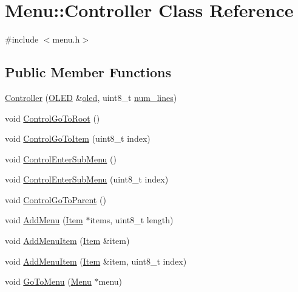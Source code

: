 \hypertarget{class_menu_1_1_controller}{}\section{Menu\+:\+:Controller Class Reference}
\label{class_menu_1_1_controller}


{\ttfamily \#include $<$menu.\+h$>$}

\subsection*{Public Member Functions}
\begin{DoxyCompactItemize}
\item 
\hyperlink{class_menu_1_1_controller_afcbda47e43a9753875631f0d4106f604}{Controller} (\hyperlink{class_o_l_e_d}{O\+L\+ED} \&\hyperlink{class_menu_1_1_controller_aaa0388123d9e3bb0d4f546336e2b502d}{oled}, uint8\+\_\+t \hyperlink{class_menu_1_1_controller_a80d614a66d1ffa2612688776842f1f31}{num\+\_\+lines})
\item 
void \hyperlink{class_menu_1_1_controller_a4d270009fff9dfc6baa4433f219626c4}{Control\+Go\+To\+Root} ()
\item 
void \hyperlink{class_menu_1_1_controller_a0dae623388e9bb9e651385d0ef9a2394}{Control\+Go\+To\+Item} (uint8\+\_\+t index)
\item 
void \hyperlink{class_menu_1_1_controller_a9a4c0ccd822f485834ec9abb4133a059}{Control\+Enter\+Sub\+Menu} ()
\item 
void \hyperlink{class_menu_1_1_controller_a8bc1d62574e86a08d5a60652370dd21a}{Control\+Enter\+Sub\+Menu} (uint8\+\_\+t index)
\item 
void \hyperlink{class_menu_1_1_controller_ad4bcb0925c933dce2cceacdbd1b26294}{Control\+Go\+To\+Parent} ()
\item 
void \hyperlink{class_menu_1_1_controller_a49696644ab887bb0e3c4d272b914d2a2}{Add\+Menu} (\hyperlink{struct_menu_1_1_item}{Item} $\ast$items, uint8\+\_\+t length)
\item 
void \hyperlink{class_menu_1_1_controller_af93dbfeff28602f68705ade90f0757fc}{Add\+Menu\+Item} (\hyperlink{struct_menu_1_1_item}{Item} \&item)
\item 
void \hyperlink{class_menu_1_1_controller_aed44f5a995f14772d8d99f663942ab30}{Add\+Menu\+Item} (\hyperlink{struct_menu_1_1_item}{Item} \&item, uint8\+\_\+t index)
\item 
void \hyperlink{class_menu_1_1_controller_a1df8e49520c77372d479903c3ec93341}{Go\+To\+Menu} (\hyperlink{struct_menu_1_1_menu}{Menu} $\ast$menu)

\end{DoxyCompactItemize}
